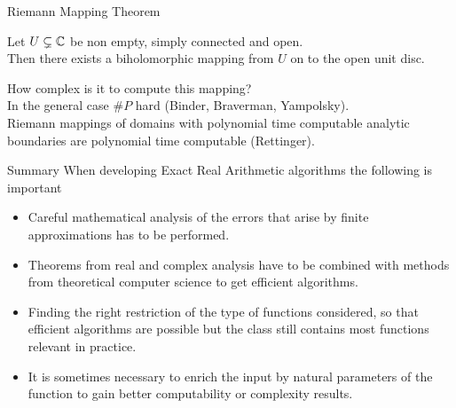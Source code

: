 \begin{frame}[t]{Riemann Mapping Theorem}
  \begin{theorem}[Riemann]
    Let $U \subsetneq \mathbb{C}$ be non empty, simply connected and open.\\
    Then there exists a biholomorphic mapping from $U$ on to the open unit disc.
  \end{theorem}
\vfill
 How complex is it to compute this mapping?\\
  \pause
  In the general case $\#P$ hard (Binder, Braverman, Yampolsky).\\
  \pause
  Riemann mappings of domains with polynomial time computable analytic boundaries are polynomial time computable (Rettinger).
\end{frame}
\begin{frame}[<+->]{Summary}
 When developing Exact Real Arithmetic algorithms the following is important
 \begin{itemize}
     \item Careful mathematical analysis of the errors that arise by finite approximations has to be performed.
     \item Theorems from real and complex analysis have to be combined with methods from theoretical computer science to get efficient algorithms.
     \item Finding the right restriction of the type of functions considered, so that efficient algorithms are possible but the class still contains most functions relevant in practice.
     \item It is sometimes necessary to enrich the input by natural parameters of the function to gain better computability or complexity results.
 \end{itemize}
\end{frame}
